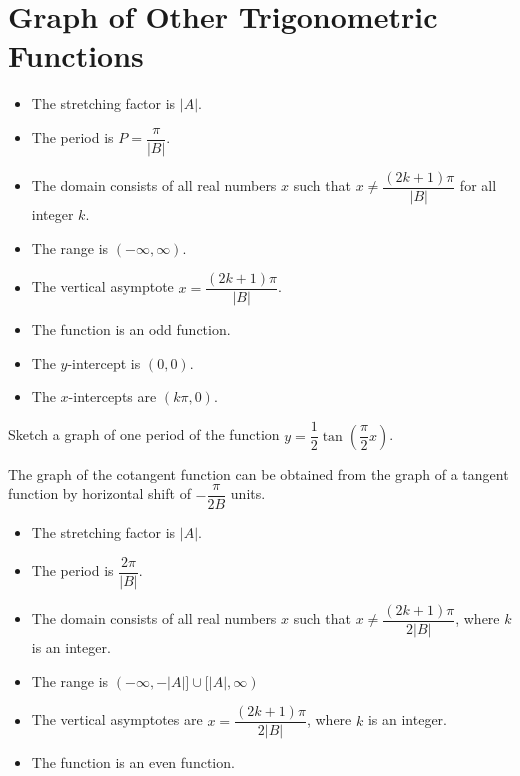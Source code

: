 \newpage

\section{Graph of Other Trigonometric Functions}

\begin{howto}[Graph of $y = A \tan(Bx)$]
  \begin{itemize}
    \item The stretching factor is $|A|$.
    \item The period is $P=\dfrac{\pi}{|B|}$.
    \item The domain consists of all real numbers $x$ such that $x\ne \dfrac{(2k+1)\pi}{|B|}$ for all integer $k$.
    \item The range is $(-\infty,\infty)$.
    \item The vertical asymptote $x=\dfrac{(2k+1)\pi}{|B|}$.
    \item The function is an odd function.
    \item The $y$-intercept is $(0, 0)$.
    \item The $x$-intercepts are $(k\pi,0)$.
  \end{itemize}
\end{howto}

\begin{example}
  Sketch a graph of one period of the function  $y=\dfrac{1}{2}\tan\left(\dfrac{\pi}{2}x\right)$.
\end{example}

\begin{note}
The graph of the cotangent function can be obtained from the graph of a tangent function by horizontal shift of $-\dfrac{\pi}{2B}$ units.
\end{note}



\newpage

\begin{howto}[Graph of $y = A \sec(Bx)$]
\begin{itemize}
  \item The stretching factor is $|A|$.
  \item The period is $\dfrac{2\pi}{|B|}$.
  \item The domain consists of all real numbers $x$ such that $x\ne \dfrac{(2k+1)\pi}{2|B|}$, where $k$ is an integer.
  \item The range is $(-\infty,- |A| ]\cup [ |A|,\infty)$
  \item The vertical asymptotes are $x=\dfrac{(2k+1)\pi}{2|B|}$, where $k$ is an integer.
  \item The function is an even function.
\end{itemize}
\end{howto}

